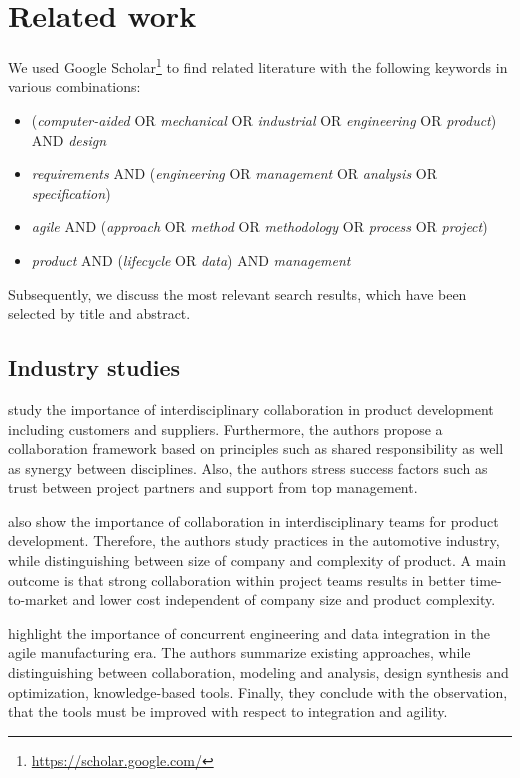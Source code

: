 \section{Related work}
\label{sec:differentiation}

We used Google Scholar\footnote{\url{https://scholar.google.com/}} to find related literature with the following keywords in various combinations:

\begin{itemize}
    \item (\textit{computer-aided} OR \textit{mechanical} OR \textit{industrial} OR \textit{engineering} OR \textit{product}) AND \textit{design}
    \item \textit{requirements} AND (\textit{engineering} OR \textit{management} OR \textit{analysis} OR \textit{specification})
    \item \textit{agile} AND (\textit{approach} OR \textit{method} OR \textit{methodology} OR \textit{process} OR \textit{project})
    \item \textit{product} AND (\textit{lifecycle} OR \textit{data}) AND \textit{management}
\end{itemize}

Subsequently, we discuss the most relevant search results, which have been selected by title and abstract.

\subsection{Industry studies}

\cite{Jassawalla} study the importance of interdisciplinary collaboration in product development including customers and suppliers.
Furthermore, the authors propose a collaboration framework based on principles such as shared responsibility as well as synergy between disciplines.
Also, the authors stress success factors such as trust between project partners and support from top management.

\cite{sanchez2003flexibility} also show the importance of collaboration in interdisciplinary teams for product development.
Therefore, the authors study practices in the automotive industry, while distinguishing between size of company and complexity of product.
A main outcome is that strong collaboration within project teams results in better time-to-market and lower cost independent of company size and product complexity.

\cite{buyukozkan2004survey} highlight the importance of concurrent engineering and data integration in the agile manufacturing era.
The authors summarize existing approaches, while distinguishing between collaboration, modeling and analysis, design synthesis and optimization, knowledge-based tools.
Finally, they conclude with the observation, that the tools must be improved with respect to integration and agility.

